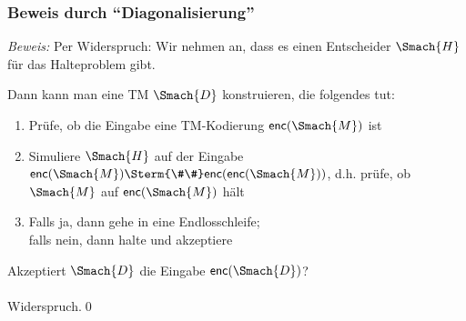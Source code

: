\documentclass[aspectratio=1610,onlymath]{beamer}
\begin{document}
\begin{frame}[t]\frametitle{Beweis durch "`Diagonalisierung"'}

\pause

\emph{Beweis:} Per Widerspruch: Wir nehmen an, dass es einen Entscheider $\Smach{H}$ für das Halteproblem gibt.\pause
\bigskip

Dann kann man eine TM $\Smach{D}$ konstruieren, die folgendes tut:
\begin{enumerate}[(1)]
\item Prüfe, ob die Eingabe eine TM-Kodierung $\textsf{enc}(\Smach{M})$ ist
\item Simuliere $\Smach{H}$ auf der Eingabe $\textsf{enc}(\Smach{M})\Sterm{\#\#}\textsf{enc}(\textsf{enc}(\Smach{M}))$, d.h. prüfe, ob $\Smach{M}$ auf $\textsf{enc}(\Smach{M})$ hält
\item Falls ja, dann gehe in eine Endlosschleife;\\ falls nein, dann halte und akzeptiere
\end{enumerate}
\bigskip\pause

\alert{Akzeptiert $\Smach{D}$ die Eingabe $\textsf{enc}(\Smach{D})$?}\pause\\[1ex]

\\[1ex]

Widerspruch.\qed

\end{frame}
\end{document}
